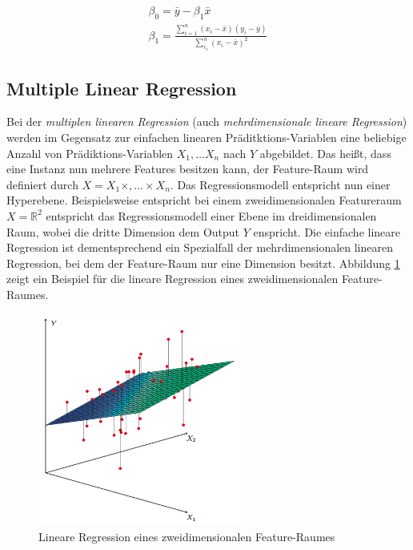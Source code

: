 \begin{equation}
\label{eq:beta0andbeta1}
\begin{gathered}
\beta_0 = \bar{y} - \beta_1 \bar{x} \\
\beta_1 = \frac{\sum_{i = 1}^{n} (x_i - \bar{x}) (y_i - \bar{y}) }{ \sum_{i_1}^{n} (x_i - \bar{x})^2  }
\end{gathered}
\end{equation}

\subsection{Multiple Linear Regression}
\label{sec:multipleRegression}

Bei der \emph{multiplen linearen Regression} (auch \emph{mehrdimensionale lineare Regression}) werden im Gegensatz zur einfachen linearen Präditktions-Variablen eine beliebige Anzahl von  Prädiktions-Variablen $X_1 , \ldots X_n$ nach $Y$ abgebildet. Das heißt, dass eine Instanz nun mehrere Features besitzen kann, der Feature-Raum wird definiert durch $X = X_1 \times , ... \times X_n$. Das Regressionsmodell entspricht nun einer Hyperebene. Beispielsweise entspricht bei einem zweidimensionalen Featureraum $X = \mathbb{R}^2$ entspricht das Regressionsmodell einer Ebene im dreidimensionalen Raum, wobei die dritte Dimension dem Output $Y$ enspricht. Die einfache lineare Regression ist dementsprechend ein Spezialfall der mehrdimensionalen linearen Regression, bei dem der Feature-Raum nur eine Dimension besitzt. \cite[Multiple Linear Regression]{regression_lecture} \cite[S.71]{statistical_learning} Abbildung \ref{img:multregression} zeigt ein Beispiel für die lineare Regression eines zweidimensionalen Feature-Raumes. 

\begin{figure}[h]
	\centering
	\includegraphics[width=0.6\textwidth]{bilder/multregression.png}
	\caption{Lineare Regression eines zweidimensionalen Feature-Raumes \cite[S. 73]{statistical_learning}}
	\label{img:multregression}
\end{figure}


